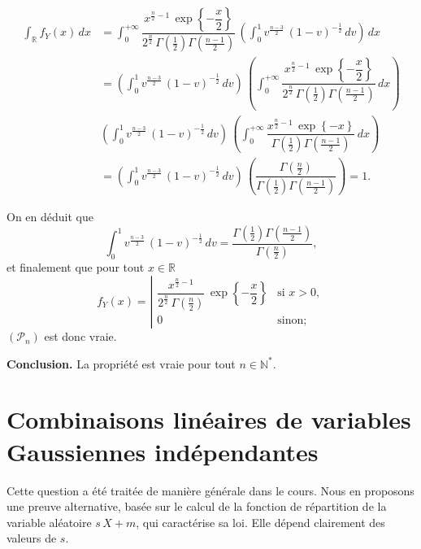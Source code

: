 \begin{align*}
\int_{\mathbb{R}} f_Y(x)\,dx &= \int_0^{+\infty} \dfrac{x^{\frac{n}{2}-1}\,\exp\left\{-\dfrac{x}{2} \right\}}{2^{\frac{n}{2}}\,\Gamma\left(\frac{1}{2}\right)\Gamma\left(\frac{n-1}{2}\right)}\,\left(\int_0^{1} v^{\frac{n-3}{2}}\,\left(1 - v\right)^{-\frac{1}{2}} \,dv\right)\,dx\\
&= \left(\int_0^{1} v^{\frac{n-3}{2}}\,\left(1 - v\right)^{-\frac{1}{2}} \,dv\right)\,\left(\int_0^{+\infty} \dfrac{x^{\frac{n}{2}-1}\,\exp\left\{-\dfrac{x}{2} \right\}}{2^{\frac{n}{2}}\,\Gamma\left(\frac{1}{2}\right)\Gamma\left(\frac{n-1}{2}\right)}\,dx\right)\\
& \left(\int_0^{1} v^{\frac{n-3}{2}}\,\left(1 - v\right)^{-\frac{1}{2}} \,dv\right)\,\left(\int_0^{+\infty} \dfrac{x^{\frac{n}{2}-1}\,\exp\left\{-x \right\}}{\Gamma\left(\frac{1}{2}\right)\Gamma\left(\frac{n-1}{2}\right)}\,dx\right)\\
&= \left(\int_0^{1} v^{\frac{n-3}{2}}\,\left(1 - v\right)^{-\frac{1}{2}} \,dv\right)\,\left( \dfrac{\Gamma\left(\frac{n}{2}\right)}{\Gamma\left(\frac{1}{2}\right)\Gamma\left(\frac{n-1}{2}\right)}\right) = 1.
\end{align*}

On en déduit que
\[ \int_0^{1} v^{\frac{n-3}{2}}\,\left(1 - v\right)^{-\frac{1}{2}} \,dv = \dfrac{\Gamma\left(\frac{1}{2}\right)\Gamma\left(\frac{n-1}{2}\right)}{\Gamma\left(\frac{n}{2}\right)}, \]
et finalement que pour tout \(x\in\mathbb{R}\)
\[f_Y(x) = \left|\begin{array}{ll} \dfrac{x^{\frac{n}{2}-1}}{2^{\frac{n}{2}}\,\Gamma\left(\frac{n}{2}\right)}\,\exp\left\{-\dfrac{x}{2}\right\} & \text{si } x> 0,\\ 0 & \text{sinon;}\end{array}\right.\]
\((\mathcal{P}_n)\) est donc vraie.

\textbf{Conclusion.} La propriété est vraie pour tout
\(n\in\mathbb{N}^\ast\).

\section{Combinaisons linéaires de variables Gaussiennes
indépendantes}\label{II-combinaisons-linuxe9aires-de-variables-gaussiennes-induxe9pendantes-1}

\label{II-answer-CLIGauss-pre}
Cette question a été traitée de manière générale dans le cours. Nous en
proposons une preuve alternative, basée sur le calcul de la fonction de
répartition de la variable aléatoire \(s\,X + m\), qui caractérise sa
loi. Elle dépend clairement des valeurs de \(s\).

